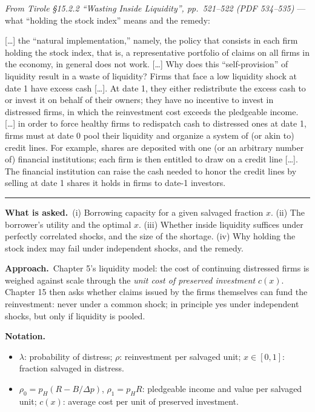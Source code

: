 \documentclass[11pt,a4paper]{article}
\newcommand{\notation}{\par\noindent\textbf{Notation.}}
\newcommand{\asked}{\par\medskip\noindent\textbf{What is asked.}~}
\newcommand{\approach}{\par\smallskip\noindent\textbf{Approach.}~}
\newcommand{\stmtend}{\par\endgroup\nopagebreak\noindent\rule{\linewidth}{0.4pt}\par\medskip}
\begin{document}
\emph{From Tirole §15.2.2 ``Wasting Inside Liquidity'', pp.~521--522 (PDF 534--535)} --- what
``holding the stock index'' means and the remedy:

{[}\ldots{]} the ``natural implementation,'' namely, the policy that consists in each firm holding
the stock index, that is, a representative portfolio of claims on all firms in the economy, in
general does not work. {[}\ldots{]} Why does this ``self-provision'' of liquidity result in a waste
of liquidity? Firms that face a low liquidity shock at date 1 have excess cash {[}\ldots{]}. At date
1, they either redistribute the excess cash to or invest it on behalf of their owners; they have no
incentive to invest in distressed firms, in which the reinvestment cost exceeds the pledgeable
income. {[}\ldots{]} in order to force healthy firms to redispatch cash to distressed ones at date
1, firms must at date 0 pool their liquidity and organize a system of (or akin to) credit lines. For
example, shares are deposited with one (or an arbitrary number of) financial institutions; each firm
is then entitled to draw on a credit line {[}\ldots{]}. The financial institution can raise the cash
needed to honor the credit lines by selling at date 1 shares it holds in firms to date-1 investors.
\stmtend

\asked (i) Borrowing capacity for a given salvaged fraction $x$. (ii) The borrower's utility and the optimal $x$. (iii) Whether inside liquidity suffices under perfectly correlated shocks, and the size of the shortage. (iv) Why holding the stock index may fail under independent shocks, and the remedy.

\approach Chapter 5's liquidity model: the cost of continuing distressed firms is weighed against scale through the \emph{unit cost of preserved investment} $c(x)$. Chapter 15 then asks whether claims issued by the firms themselves can fund the reinvestment: never under a common shock; in principle yes under independent shocks, but only if liquidity is pooled.

\notation
\begin{itemize}
  \item $\lambda$: probability of distress; $\rho$: reinvestment per salvaged unit; $x\in[0,1]$: fraction salvaged in distress.
  \item $\rho_0=p_H(R-B/\Delta p)$, $\rho_1=p_HR$: pledgeable income and value per salvaged unit; $c(x)$: average cost per unit of preserved investment.
\end{itemize}
\end{document}
